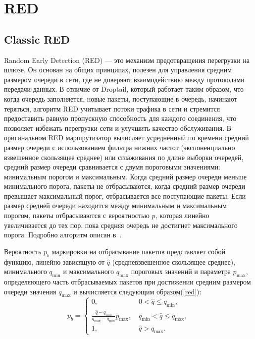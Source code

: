 \chapter{RED}

\section{Classic RED}


Random Early Detection (RED) — это механизм предотвращения перегрузки
на шлюзе. Он основан на общих принципах, полезен для управления
средним размером очереди в сети, где не доверяют взаимодействию между
протоколами передачи данных. В отличие от Droptail, который работает
таким образом, что когда очередь заполняется, новые пакеты,
поступающие в очередь, начинают теряться, алгоритм RED учитывает
потоки трафика в сети и стремится предоставить равную пропускную
способность для каждого соединения, что позволяет избежать перегрузки
сети и улучшить качество обслуживания. В оригинальном RED
маршрутизатор вычисляет усредненный по времени средний размер очереди
с использованием фильтра нижних частот (экспоненциально взвешенное
скользящее среднее) или сглаживания по длине выборки очередей, средний
размер очереди сравнивается с двумя пороговыми значениями: минимальным
порогом и максимальным. Когда средний размер очереди меньше
минимального порога, пакеты не отбрасываются, когда средний размер
очереди превышает максимальный порог, отбрасывается все поступающие
пакеты. Если размер средней очереди находится между минимальным и
максимальным порогом, пакеты отбрасываются с вероятностью $p$, которая
линейно увеличивается до тех пор, пока средняя очередь не достигнет
максимального порога. Подробно алгоритм описан в~\cite{RED1,RED2}.
 
Вероятность $p_{b}$ маркировки на отбрасывание пакетов представляет
собой функцию, линейно зависящую от $\hat{q}$ (средневзвешенное
скользящее среднее), минимального $q_{\min}$ и максимального
$q_{\max}$ пороговых значений и параметра $p_{\max}$, определяющего
часть отбрасываемых пакетов при достижении средним размером очереди
значения $q_{\max}$ и вычисляется следующим образом(\ref{red}):
\begin{equation}
\label{red}
p_{b} = \begin{cases}
        0, &  \ 0 < \hat{q} \leqslant q_{\min},
        \\
        \frac{\hat{q} - q_{\min}}{q_{\max} - q_{\min}} p_{\max}, & \ q_{\min} < \hat{q} \leqslant q_{\max}, 
        \\
        1, &  \ \hat{q} > q_{\max}.
\end{cases}                                     
\end{equation}

